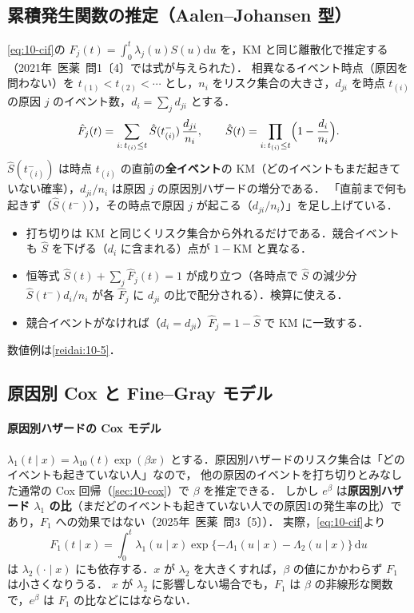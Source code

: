 \documentclass[a4paper,11pt,openany]{ltjsbook}
\newcommand{\tagbox}[2]{\tcbox[on line,boxsep=0.5pt,left=2pt,right=2pt,top=0.5pt,bottom=0.5pt,
  colframe=#1,colback=#1!10,boxrule=0.4pt,arc=1pt]{\scriptsize\bfseries\textcolor{#1}{#2}}}
\newcommand{\Hinshutsu}{\tagbox{bkorange}{頻出}}
\newcommand{\kakomon}[2]{\mbox{#1年 医薬 問#2}}
\newcommand{\dd}{\mathrm{d}}
\begin{document}
\subsection{累積発生関数の推定（Aalen--Johansen 型）}\label{subsec:10-compete-aj}
\Hinshutsu
\cref{eq:10-cif}の $F_j(t)=\int_0^t\lambda_j(u)S(u)\dd u$ を，KM と同じ離散化で推定する（\kakomon{2021}{1}〔4〕では式が与えられた）．
相異なるイベント時点（原因を問わない）を $t_{(1)}<t_{(2)}<\cdots$ とし，$n_i$ をリスク集合の大きさ，$d_{ji}$ を時点 $t_{(i)}$ の原因 $j$ のイベント数，$d_i=\sum_jd_{ji}$ とする．
\begin{equation}
\hat F_j(t)=\sum_{i:\,t_{(i)}\le t}\hat S(t_{(i)}^-)\,\frac{d_{ji}}{n_i},\qquad \hat S(t)=\prod_{i:\,t_{(i)}\le t}\Bigl(1-\frac{d_i}{n_i}\Bigr).\label{eq:10-aj}
\end{equation}
$\hat S(t_{(i)}^-)$ は時点 $t_{(i)}$ の直前の\textbf{全イベント}の KM（どのイベントもまだ起きていない確率），$d_{ji}/n_i$ は原因 $j$ の原因別ハザードの増分である．
「直前まで何も起きず（$\hat S(t^-)$），その時点で原因 $j$ が起こる（$d_{ji}/n_i$）」を足し上げている．
\begin{itemize}
\item 打ち切りは KM と同じくリスク集合から外れるだけである．競合イベントも $\hat S$ を下げる（$d_i$ に含まれる）点が $1-\mathrm{KM}$ と異なる．
\item 恒等式 $\hat S(t)+\sum_j\hat F_j(t)=1$ が成り立つ（各時点で $\hat S$ の減少分 $\hat S(t^-)d_i/n_i$ が各 $\hat F_j$ に $d_{ji}$ の比で配分される）．検算に使える．
\item 競合イベントがなければ（$d_i=d_{ji}$）$\hat F_j=1-\hat S$ で KM に一致する．
\end{itemize}
数値例は\cref{reidai:10-5}．

\subsection{原因別 Cox と Fine--Gray モデル}\label{subsec:10-compete-reg}
\Hinshutsu
\paragraph{原因別ハザードの Cox モデル}
$\lambda_1(t\mid x)=\lambda_{10}(t)\exp(\beta x)$ とする．原因別ハザードのリスク集合は「どのイベントも起きていない人」なので，
他の原因のイベントを打ち切りとみなした通常の Cox 回帰（\cref{sec:10-cox}）で $\beta$ を推定できる．
しかし $e^\beta$ は\textbf{原因別ハザード $\lambda_1$ の比}（まだどのイベントも起きていない人での原因1の発生率の比）であり，$F_1$ への効果ではない（\kakomon{2025}{3}〔5〕）．
実際，\cref{eq:10-cif}より
\[
F_1(t\mid x)=\int_0^t\lambda_1(u\mid x)\exp\{-\Lambda_1(u\mid x)-\Lambda_2(u\mid x)\}\,\dd u
\]
は $\lambda_2(\cdot\mid x)$ にも依存する．$x$ が $\lambda_2$ を大きくすれば，$\beta$ の値にかかわらず $F_1$ は小さくなりうる．
$x$ が $\lambda_2$ に影響しない場合でも，$F_1$ は $\beta$ の非線形な関数で，$e^\beta$ は $F_1$ の比などにはならない．
\end{document}
